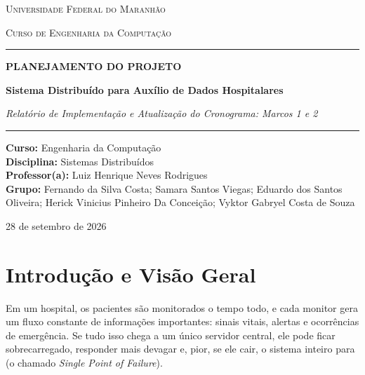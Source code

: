 \documentclass[12pt,a4paper]{article}
\begin{document}
	
	\begin{titlepage}
		\centering
		\vspace*{1cm}
		
		{\scshape\Large Universidade Federal do Maranhão \par}
		\vspace{0.3cm}
		{\scshape\large Curso de Engenharia da Computação \par}
		\vspace{1.5cm}
		
		\rule{\linewidth}{1.5pt}\vspace{0.4cm}
		{\Huge\bfseries PLANEJAMENTO DO PROJETO\par}
		\vspace{0.5cm}
		{\LARGE\bfseries Sistema Distribuído para Auxílio de Dados Hospitalares\par}
		\vspace{0.3cm}
		{\Large\itshape Relatório de Implementação e Atualização do Cronograma: Marcos 1 e 2\par}
		\rule{\linewidth}{1.5pt}
		
		\vspace{2cm}
		
		\begin{minipage}{0.85\textwidth}
			\raggedright
			\textbf{Curso:} Engenharia da Computação \\[6pt]
			\textbf{Disciplina:} Sistemas Distribuídos \\[6pt]
			\textbf{Professor(a):} Luiz Henrique Neves Rodrigues \\[6pt]
			\textbf{Grupo:} Fernando da Silva Costa; Samara Santos Viegas; Eduardo dos Santos Oliveira; Herick Vinicius Pinheiro Da Conceição; Vyktor Gabryel Costa de Souza
		\end{minipage}
		
		\vfill
		
		{\large 28 de setembro de 2026 \par}
	\end{titlepage}
	
	\newpage
	\tableofcontents
	\newpage
	
	\section{Introdução e Visão Geral}
	
	Em um hospital, os pacientes são monitorados o tempo todo, e cada monitor gera um fluxo constante de informações importantes: sinais vitais, alertas e ocorrências de emergência. Se tudo isso chega a um único servidor central, ele pode ficar sobrecarregado, responder mais devagar e, pior, se ele cair, o sistema inteiro para (o chamado \textit{Single Point of Failure}).
	
\end{document}
